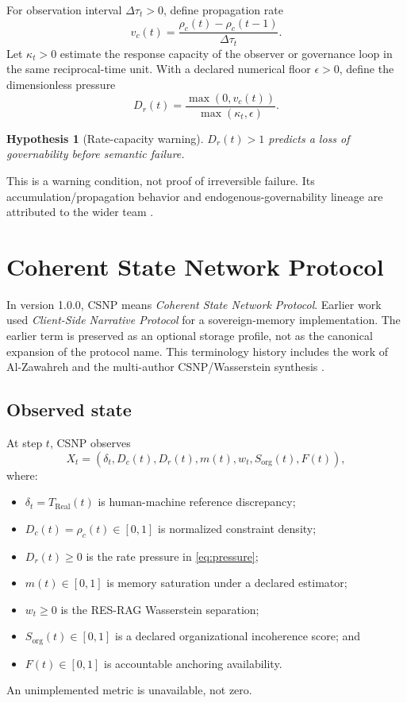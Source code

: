 \documentclass[11pt]{article}
\newtheorem{hypothesis}{Hypothesis}
\begin{document}
For observation interval $\Delta\tau_t>0$, define propagation rate
\begin{equation}
v_c(t)=
\frac{\rho_c(t)-\rho_c(t-1)}{\Delta\tau_t}.
\label{eq:rate}
\end{equation}
Let $\kappa_t>0$ estimate the response capacity of the observer or governance
loop in the same reciprocal-time unit. With a declared numerical floor
$\epsilon>0$, define the dimensionless pressure
\begin{equation}
D_r(t)=
\frac{\max(0,v_c(t))}{\max(\kappa_t,\epsilon)}.
\label{eq:pressure}
\end{equation}

\begin{hypothesis}[Rate-capacity warning]
$D_r(t)>1$ predicts a loss of governability before semantic failure.
\label{hyp:capacity}
\end{hypothesis}
This is a warning condition, not proof of irreversible failure. Its
accumulation/propagation behavior and endogenous-governability lineage are
attributed to the wider team \citep{team-endogenous-stability}.

\section{Coherent State Network Protocol}

In version 1.0.0, CSNP means \emph{Coherent State Network Protocol}. Earlier
work used \emph{Client-Side Narrative Protocol} for a sovereign-memory
implementation. The earlier term is preserved as an optional storage profile,
not as the canonical expansion of the protocol name. This terminology history
includes the work of Al-Zawahreh and the multi-author CSNP/Wasserstein
synthesis \citep{csnp-wasserstein}.

\subsection{Observed state}

At step $t$, CSNP observes
\begin{equation}
X_t=
\left(
\delta_t,D_c(t),D_r(t),m(t),w_t,S_{\mathrm{org}}(t),F(t)
\right),
\label{eq:state}
\end{equation}
where:
\begin{itemize}
  \item $\delta_t=T_{\mathrm{Real}}(t)$ is human-machine reference discrepancy;
  \item $D_c(t)=\rho_c(t)\in[0,1]$ is normalized constraint density;
  \item $D_r(t)\geq0$ is the rate pressure in \cref{eq:pressure};
  \item $m(t)\in[0,1]$ is memory saturation under a declared estimator;
  \item $w_t\geq0$ is the RES-RAG Wasserstein separation;
  \item $S_{\mathrm{org}}(t)\in[0,1]$ is a declared organizational
        incoherence score; and
  \item $F(t)\in[0,1]$ is accountable anchoring availability.
\end{itemize}
An unimplemented metric is unavailable, not zero.
\end{document}
